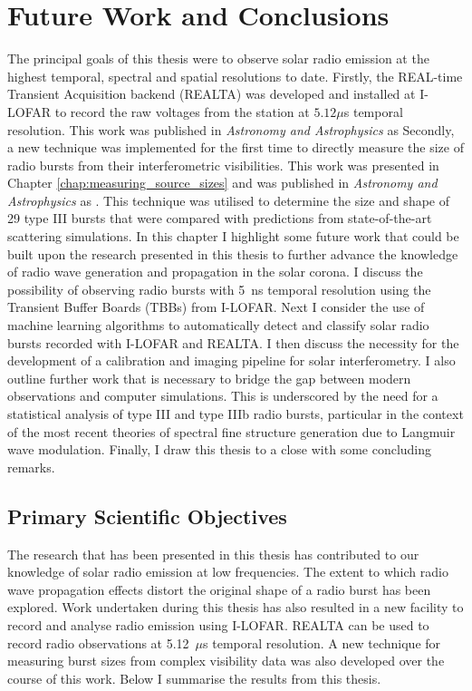 \doublespacing
\chapter{Future Work and Conclusions}
\label{chap:future}
The principal goals of this thesis were to observe solar radio emission at the highest temporal, spectral and spatial resolutions to date. Firstly, the REAL-time Transient Acquisition backend (REALTA) was developed and installed at I-LOFAR to record the raw voltages from the station at $5.12 \mu$s temporal resolution. This work was published in \textit{Astronomy and Astrophysics} as \cite{Murphy2021b}
Secondly, a new technique was implemented for the first time to directly measure the size of radio bursts from their interferometric visibilities. This work was presented in Chapter \ref{chap:measuring_source_sizes} and was published in \textit{Astronomy and Astrophysics} as \cite{Murphy2021}. This technique was utilised to determine the size and shape of 29 type III bursts that were compared with predictions from state-of-the-art scattering simulations.
In this chapter I highlight some future work that could be built upon the research presented in this thesis to further advance the knowledge of radio wave generation and propagation in the solar corona. I discuss the possibility of observing radio bursts with 5~ns temporal resolution using the Transient Buffer Boards (TBBs) from I-LOFAR. Next I consider the use of machine learning algorithms to automatically detect and classify solar radio bursts recorded with I-LOFAR and REALTA. I then discuss the necessity for the development of a calibration and imaging pipeline for solar interferometry. I also outline further work that is necessary to bridge the gap between modern observations and computer simulations. This is underscored by the need for a statistical analysis of type III and type IIIb radio bursts, particular in the context of the most recent theories of spectral fine structure generation due to Langmuir wave modulation. Finally, I draw this thesis to a close with some concluding remarks.

\section{Primary Scientific Objectives}
The research that has been presented in this thesis has contributed to our knowledge of solar radio emission at low frequencies. The extent to which radio wave propagation effects distort the original shape of a radio burst has been explored. Work undertaken during this thesis has also resulted in a new facility to record and analyse radio emission using I-LOFAR. REALTA can be used to record radio observations at 5.12~$\mu$s temporal resolution. A new technique for measuring burst sizes from complex visibility data was also developed over the course of this work. Below I summarise the results from this thesis. 

